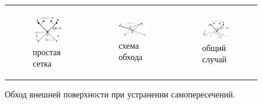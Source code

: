 \documentclass[a4paper,14pt]{extarticle}                     %
\theoremstyle{plain}                                         %
\begin{document}
\begin{figure}[ht]
\centering
\begin{tabular}{lll}
\begin{subfigure}{0.33\textwidth}\centering\includegraphics[width=0.6\columnwidth]{fig/int_walk_simple_big.pdf}\caption{простая сетка}\end{subfigure} &
\begin{subfigure}{0.33\textwidth}\centering\includegraphics[width=0.7\columnwidth]{fig/int_walk_centre_big.pdf}\caption{схема обхода}\end{subfigure} &
\begin{subfigure}{0.33\textwidth}\centering\includegraphics[width=0.7\columnwidth]{fig/int_walk_not_simple_big.pdf}\caption{общий случай}\end{subfigure}
\end{tabular}
\singlespacing
\caption{Обход внешней поверхности при устранении самопересечений.}
\label{fig:int_walk}
\end{figure}
\end{document}
